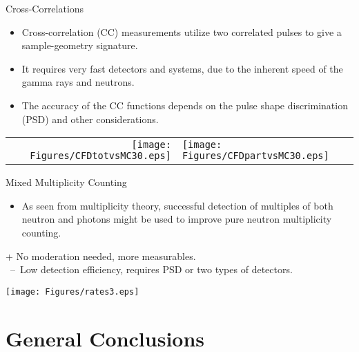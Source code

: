 \documentclass[clock,style=horatio,paper=screen,blackslide,trans=Wipe,mode=present]{powerdot}
\begin{document}
\begin{slide}{Cross-Correlations}
\begin{itemize}
    \item Cross-correlation (CC) measurements utilize two
        correlated pulses to give a sample-geometry signature. \\[1mm]
    \item It requires very fast detectors and systems, due to
        the inherent speed of the gamma rays and neutrons. \\[1mm]
    \item The accuracy of the CC functions depends on the
        pulse shape discrimination (PSD) and other
        considerations.
\end{itemize}
\vspace{-1mm} \centering
\begin{tabular}{r l}
\hspace{-4mm}
\texttt{[image: Figures/CFDtotvsMC30.eps]} &    \hspace{-5mm}
\texttt{[image: Figures/CFDpartvsMC30.eps]}
\end{tabular}
\end{slide}


\begin{slide}{Mixed Multiplicity Counting}
\begin{itemize}
    \item As seen from multiplicity theory, successful
        detection of multiples of both neutron and photons
        might be used to improve pure neutron multiplicity
        counting.
\end{itemize}
+ No moderation needed, more measurables. \\[1mm]

\, -- \,Low detection efficiency, requires PSD or two types of
detectors.

\centering
\texttt{[image: Figures/rates3.eps]}
\end{slide}



\section[slide=false]{General Conclusions}
\end{document}
